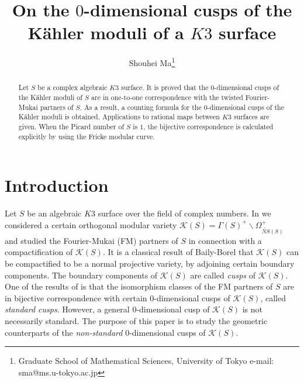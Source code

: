 \documentclass{article}
\theoremstyle{plain}
\theoremstyle{definition}
\theoremstyle{remark}
\begin{document}
\title{On the $0$-dimensional cusps of the K\"ahler moduli of a $K3$ surface} 
\author{Shouhei Ma\thanks{Graduate School of Mathematical Sciences, University of Tokyo  \endgraf
e-mail: sma@ms.u-tokyo.ac.jp } }
\date{}
\maketitle





\begin{abstract}
Let $S$ be a complex algebraic $K3$ surface. 
It is proved that 
the $0$-dimensional cusps of the K\"ahler moduli of $S$ 
are 
in one-to-one correspondence with 
the twisted Fourier-Mukai partners of $S$. 
As a result,    
a counting formula for the $0$-dimensional cusps of the K\"ahler moduli is obtained. 
Applications to 
rational maps between $K3$ surfaces 
are given.   
When the Picard number of $S$ is $1$, 
the bijective correspondence is calculated explicitly  
by using the Fricke modular curve.
\end{abstract}







\section{Introduction}\label{intro}


Let $S$ be an algebraic $K3$ surface over the field of complex numbers. 
In \cite{Ma1} 
we considered a certain orthogonal modular variety 
$\mathcal{K} (S) = \Gamma (S)^{+} \backslash \Omega _{\widetilde{NS}(S)}^{+}$ 
and studied the Fourier-Mukai (FM) partners of $S$ 
in connection with 
a compactification of 
$\mathcal{K} (S)$. 
It is a classical result of Baily-Borel \cite{B-B} 
that $\mathcal{K} (S)$ can be compactified 
to be a normal projective variety, 
by adjoining certain boundary components. 
The boundary components of  
$\mathcal{K} (S)$ 
are called {\it cusps\/} of 
$\mathcal{K} (S)$. 
One of the results of \cite{Ma1} 
is that 
the isomorphism classes of the FM partners of $S$ 
are in bijective correspondence with 
certain $0$-dimensional cusps of $\mathcal{K} (S)$, 
called {\it standard cusps\/}.       
However, 
a general $0$-dimensional cusp of $\mathcal{K} (S)$ 
is not necessarily standard. 
The purpose of this paper 
is to study the geometric counterparts 
of the {\it non-standard\/} $0$-dimensional cusps of $\mathcal{K} (S)$.  
\end{document}
